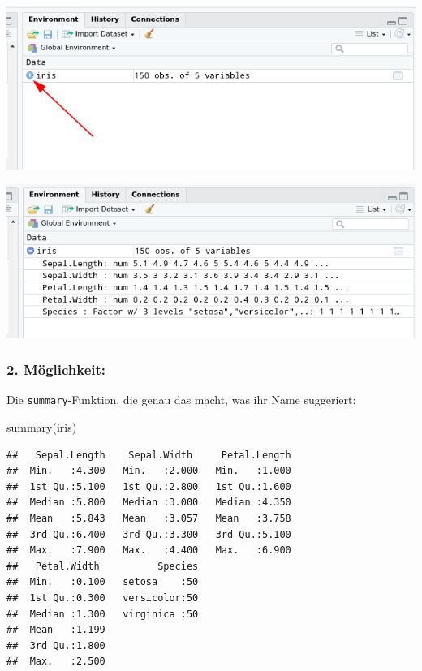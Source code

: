 \documentclass[
]{book}
\newenvironment{Shaded}{\begin{snugshade}}{\end{snugshade}}
\newcommand{\FunctionTok}[1]{\textcolor[rgb]{0.00,0.00,0.00}{#1}}
\newcommand{\NormalTok}[1]{#1}
\begin{document}
\begin{center}\includegraphics[width=1\linewidth]{imgs/summ1} \end{center}

\begin{center}\includegraphics[width=1\linewidth]{imgs/summ2} \end{center}

\hypertarget{muxf6glichkeit-1}{%
\subsubsection{2. Möglichkeit:}\label{muxf6glichkeit-1}}

Die \texttt{summary}-Funktion, die genau das macht, was ihr Name suggeriert:

\begin{Shaded}
\begin{Highlighting}[]
\FunctionTok{summary}\NormalTok{(iris)}
\end{Highlighting}
\end{Shaded}

\begin{verbatim}
##   Sepal.Length    Sepal.Width     Petal.Length  
##  Min.   :4.300   Min.   :2.000   Min.   :1.000  
##  1st Qu.:5.100   1st Qu.:2.800   1st Qu.:1.600  
##  Median :5.800   Median :3.000   Median :4.350  
##  Mean   :5.843   Mean   :3.057   Mean   :3.758  
##  3rd Qu.:6.400   3rd Qu.:3.300   3rd Qu.:5.100  
##  Max.   :7.900   Max.   :4.400   Max.   :6.900  
##   Petal.Width          Species  
##  Min.   :0.100   setosa    :50  
##  1st Qu.:0.300   versicolor:50  
##  Median :1.300   virginica :50  
##  Mean   :1.199                  
##  3rd Qu.:1.800                  
##  Max.   :2.500
\end{verbatim}
\end{document}
